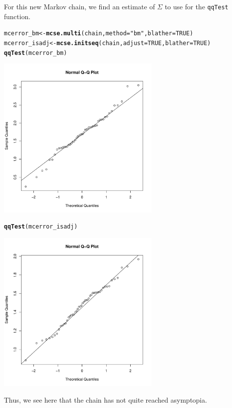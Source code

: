 \documentclass[11pt]{article}\usepackage[]{graphicx}\usepackage[]{color}
\makeatletter
\newcommand{\hlnum}[1]{\textcolor[rgb]{0.686,0.059,0.569}{#1}}%
\newcommand{\hlstr}[1]{\textcolor[rgb]{0.192,0.494,0.8}{#1}}%
\newcommand{\hlstd}[1]{\textcolor[rgb]{0.345,0.345,0.345}{#1}}%
\newcommand{\hlkwb}[1]{\textcolor[rgb]{0.69,0.353,0.396}{#1}}%
\newcommand{\hlkwc}[1]{\textcolor[rgb]{0.333,0.667,0.333}{#1}}%
\newcommand{\hlkwd}[1]{\textcolor[rgb]{0.737,0.353,0.396}{\textbf{#1}}}%
\newenvironment{kframe}{%
 \def\at@end@of@kframe{}%
 \ifinner\ifhmode%
  \def\at@end@of@kframe{\end{minipage}}%
  \begin{minipage}{\columnwidth}%
 \fi\fi%
 \def\FrameCommand##1{\hskip\@totalleftmargin \hskip-\fboxsep
 \colorbox{shadecolor}{##1}\hskip-\fboxsep
     \hskip-\linewidth \hskip-\@totalleftmargin \hskip\columnwidth}%
 \MakeFramed {\advance\hsize-\width
   \@totalleftmargin\z@ \linewidth\hsize
   \@setminipage}}%
 {\par\unskip\endMakeFramed%
 \at@end@of@kframe}
\newenvironment{knitrout}{}{} %
\makeatother
\begin{document}
For this new Markov chain, we find an estimate of $\Sigma$ to use for the \texttt{qqTest} function.

\begin{knitrout}
\color{fgcolor}\begin{kframe}
\begin{alltt}
\hlstd{mcerror_bm} \hlkwb{<-} \hlkwd{mcse.multi}\hlstd{(chain,} \hlkwc{method} \hlstd{=} \hlstr{"bm"}\hlstd{,} \hlkwc{blather} \hlstd{=} \hlnum{TRUE}\hlstd{)}
\hlstd{mcerror_isadj} \hlkwb{<-} \hlkwd{mcse.initseq}\hlstd{(chain,} \hlkwc{adjust} \hlstd{=} \hlnum{TRUE}\hlstd{,} \hlkwc{blather} \hlstd{=} \hlnum{TRUE}\hlstd{)}
\hlkwd{qqTest}\hlstd{(mcerror_bm)}
\end{alltt}
\end{kframe}
\includegraphics[width=8cm]{figure/qq-1} 
\begin{kframe}\begin{alltt}
\hlkwd{qqTest}\hlstd{(mcerror_isadj)}
\end{alltt}
\end{kframe}
\includegraphics[width=8cm]{figure/qq-2} 

\end{knitrout}

Thus, we see here that the chain has not quite reached asymptopia.


\end{document}
